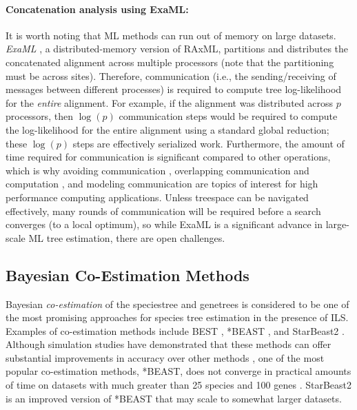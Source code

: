 \paragraph{Concatenation analysis using ExaML:}
It is worth noting that ML methods can run out of memory on large datasets.
\textit{\gls{ExaML}} \cite{kozlov2015examl}, a distributed-memory version of \gls{RAxML}, partitions and distributes the concatenated alignment across multiple processors (note that the partitioning must be across sites).
Therefore, communication (i.e., the sending/receiving of messages between different processes) is required to compute tree log-likelihood for the {\em entire} alignment.
For example, if the alignment was distributed across $p$ processors, then $\log(p)$ communication steps would be required to compute the log-likelihood for the entire alignment using a standard global reduction; these $\log(p)$ steps are effectively serialized work.
Furthermore, the amount of time required for communication is significant compared to other operations, which is why avoiding communication \cite{demmel2013communication}, overlapping communication and computation  \cite{hoefler2007implementation}, and modeling communication  \cite{culler1993logp, alexandrov1995loggp, gropp2016modeling} are topics of interest for high performance computing applications.
Unless \gls{treespace} can be navigated effectively, many rounds of communication will be required before a search converges (to a local optimum), so while ExaML is a significant advance in large-scale ML tree estimation, there are open challenges.

\subsection{Bayesian Co-Estimation Methods}
\label{sec:background-co-estimation}
Bayesian \textit{\gls{co-estimation}} of the \gls{speciestree} and \glspl{genetree} is considered to be one of the most promising approaches for species tree estimation in the presence of \gls{ILS}.
Examples of co-estimation methods include BEST \cite{edwards2007high,liu2008best}, *BEAST \cite{heled2010bayesian}, and StarBeast2 \cite{ogilvie2017starbeast2}. 
Although simulation studies have demonstrated that these methods can offer substantial improvements in accuracy over other methods \cite{edwards2009is, leache2010accuracy, bayzid2013naive}, one of the most popular co-estimation methods, *BEAST, does not converge in practical amounts of time on datasets with much greater than 25 species and 100 \glspl{gene} \cite{mcCormack2009maximum, zimmermann2014bbca, leavitt2016resolving}. 
StarBeast2 is an improved version of *BEAST that may scale to somewhat larger datasets.

